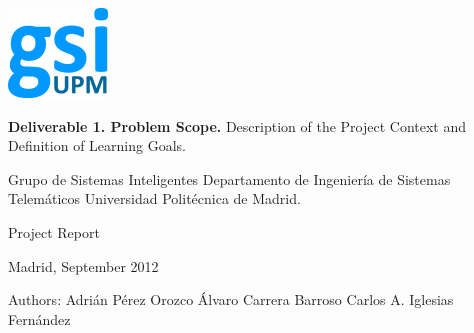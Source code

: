 \begin{titlepage}
\sffamily
\begin{flushright}

\rightskip=-1cm

\includegraphics[scale=1]{./img/logoGSI.png} 

\bigskip
\bigskip
\bigskip



\LARGE{\textbf{Deliverable 1. Problem Scope.}}
\linebreak
\large{Description of the Project Context and Definition of Learning Goals.}

\bigskip

\LARGE{Grupo de Sistemas Inteligentes}
\linebreak
\large{Departamento de Ingeniería de Sistemas Telemáticos}
\linebreak
\large{Universidad Politécnica de Madrid.}

\bigskip
\bigskip
\bigskip
\bigskip
\bigskip
\bigskip

\large{Project Report}

\bigskip

\normalsize{Madrid, September 2012}

\bigskip
\bigskip
\bigskip
\bigskip
\bigskip
\bigskip
\bigskip
\bigskip
\bigskip
\bigskip
\bigskip
\bigskip
\bigskip
\bigskip
\bigskip
\bigskip

\normalsize{Authors:}
\linebreak
\large{Adrián Pérez Orozco}
\linebreak
\large{Álvaro Carrera Barroso}
\linebreak
\large{Carlos A. Iglesias Fernández}

\end{flushright}
\end{titlepage}
